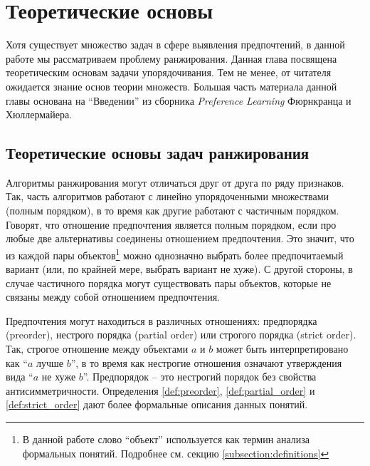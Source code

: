 \chapter{Теоретические основы}
\label{chapter:theory}

Хотя существует множество задач в сфере выявления предпочтений, в данной работе мы рассматриваем проблему ранжирования. Данная глава посвящена теоретическим основам задачи упорядочивания. Тем не менее, от читателя ожидается знание основ теории множеств. Большая часть материала данной главы основана на \enquote{Введении} из сборника \textit{Preference Learning} Фюрнкранца и Хюллермайера\cite{plbook:Introduction:2010}.


\section{Теоретические основы задач ранжирования}

	Алгоритмы ранжирования могут отличаться друг от друга по ряду признаков. Так, часть алгоритмов работают с линейно упорядоченными множествами (полным порядком), в то время как другие работают с частичным порядком. Говорят, что отношение предпочтения является полным порядком, если про любые две альтернативы соединены отношением предпочтения. Это значит, что из каждой пары объектов\footnote{В данной работе слово \enquote{объект} используется как термин анализа формальных понятий. Подробнее см. секцию \ref{subsection:definitions}} можно однозначно выбрать более предпочитаемый вариант (или, по крайней мере, выбрать вариант не хуже). С другой стороны, в случае частичного порядка могут существовать пары объектов, которые не связаны между собой отношением предпочтения.
	
	Предпочтения могут находиться в различных отношениях: предпорядка (preorder), нестрого порядка (partial order) или строгого порядка (strict order). Так, строгое отношение между объектами $a$ и $b$ может быть интерпретировано как \enquote{$a$ лучше $b$}, в то время как нестрогие отношения означают утверждения вида \enquote{$a$ не хуже $b$}\cite[p.~384]{Barten:1982}. Предпорядок – это нестрогий порядок без свойства антисимметричности. Определения \ref{def:preorder}, \ref{def:partial_order} и \ref{def:strict_order} дают более формальные описания данных понятий.
	
